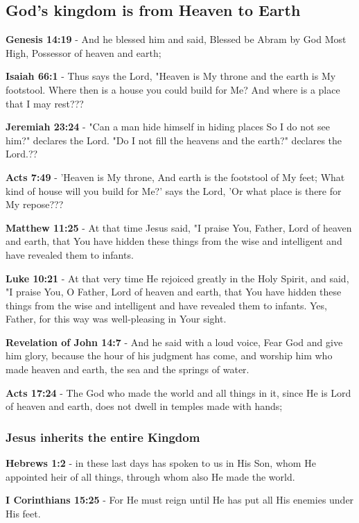 \documentclass[11pt]{article}
\begin{document}
\subsection{God's kingdom is from Heaven to Earth}
\label{sec:org3f0a81b}
\textbf{Genesis 14:19} - And he blessed him and said, Blessed be Abram by God Most High, Possessor of heaven and earth;

\textbf{Isaiah 66:1} - Thus says the Lord, "Heaven is My throne and the earth is My footstool. Where then is a house you could build for Me? And where is a place that I may rest???

\textbf{Jeremiah 23:24} - "Can a man hide himself in hiding places So I do not see him?" declares the Lord. "Do I not fill the heavens and the earth?" declares the Lord.??

\textbf{Acts 7:49} - 'Heaven is My throne, And earth is the footstool of My feet; What kind of house will you build for Me?' says the Lord, 'Or what place is there for My repose???

\textbf{Matthew 11:25} - At that time Jesus said, "I praise You, Father, Lord of heaven and earth, that You have hidden these things from the wise and intelligent and have revealed them to infants.

\textbf{Luke 10:21} - At that very time He rejoiced greatly in the Holy Spirit, and said, "I praise You, O Father, Lord of heaven and earth, that You have hidden these things from the wise and intelligent and have revealed them to infants. Yes, Father, for this way was well-pleasing in Your sight.

\textbf{Revelation of John 14:7} - And he said with a loud voice, Fear God and give him glory, because the hour of his judgment has come, and worship him who made heaven and earth, the sea and the springs of water.

\textbf{Acts 17:24} - The God who made the world and all things in it, since He is Lord of heaven and earth, does not dwell in temples made with hands;

\subsubsection{Jesus inherits the entire Kingdom}
\label{sec:orga680d76}
\textbf{Hebrews 1:2} - in these last days has spoken to us in His Son, whom He appointed heir of all things, through whom also He made the world.

\textbf{I Corinthians 15:25} - For He must reign until He has put all His enemies under His feet.
\end{document}
